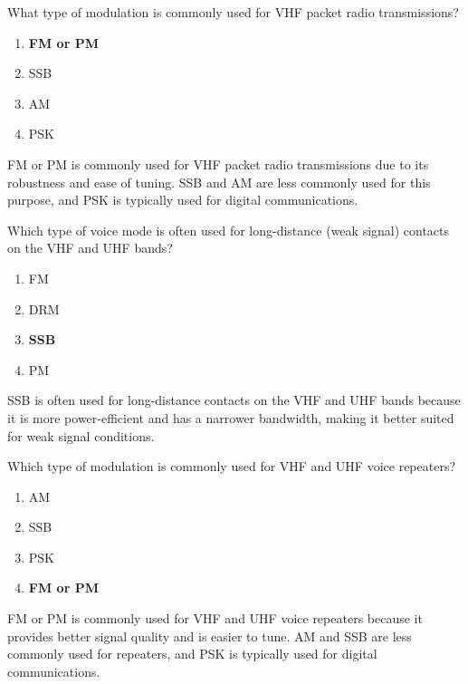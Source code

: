 
\begin{tcolorbox}[colback=gray!10!white,colframe=black!75!black,title={T8A02}]
    What type of modulation is commonly used for VHF packet radio transmissions?
    \begin{enumerate}[label=\Alph*,noitemsep]
        \item \textbf{FM or PM}
        \item SSB
        \item AM
        \item PSK
    \end{enumerate}
\end{tcolorbox}
FM or PM is commonly used for VHF packet radio transmissions due to its robustness and ease of tuning. SSB and AM are less commonly used for this purpose, and PSK is typically used for digital communications.


\begin{tcolorbox}[colback=gray!10!white,colframe=black!75!black,title={T8A03}]
    Which type of voice mode is often used for long-distance (weak signal) contacts on the VHF and UHF bands?
    \begin{enumerate}[label=\Alph*,noitemsep]
        \item FM
        \item DRM
        \item \textbf{SSB}
        \item PM
    \end{enumerate}
\end{tcolorbox}
SSB is often used for long-distance contacts on the VHF and UHF bands because it is more power-efficient and has a narrower bandwidth, making it better suited for weak signal conditions.


\begin{tcolorbox}[colback=gray!10!white,colframe=black!75!black,title={T8A04}]
    Which type of modulation is commonly used for VHF and UHF voice repeaters?
    \begin{enumerate}[label=\Alph*,noitemsep]
        \item AM
        \item SSB
        \item PSK
        \item \textbf{FM or PM}
    \end{enumerate}
\end{tcolorbox}
FM or PM is commonly used for VHF and UHF voice repeaters because it provides better signal quality and is easier to tune. AM and SSB are less commonly used for repeaters, and PSK is typically used for digital communications.

